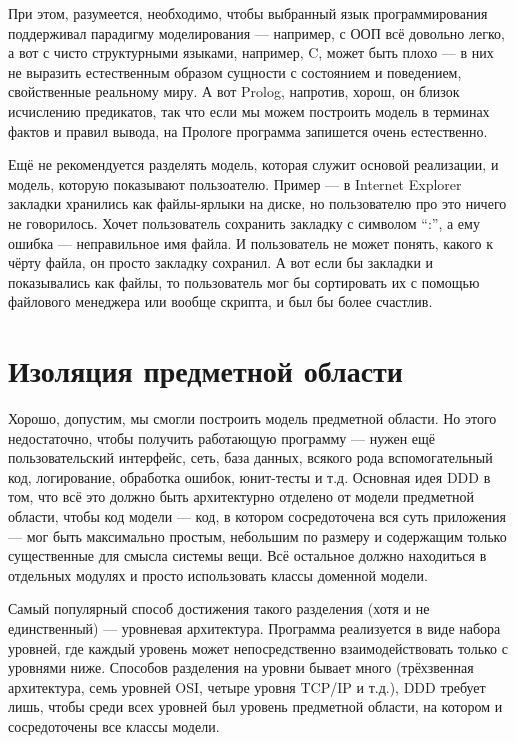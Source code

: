 \documentclass[a5paper]{article}
\begin{document}
При этом, разумеется, необходимо, чтобы выбранный язык программирования поддерживал парадигму моделирования --- например, с ООП всё довольно легко, а вот с чисто структурными языками, например, C, может быть плохо --- в них не выразить естественным образом сущности с состоянием и поведением, свойственные реальному миру. А вот Prolog, напротив, хорош, он близок исчислению предикатов, так что если мы можем построить модель в терминах фактов и правил вывода, на Прологе программа запишется очень естественно.

Ещё не рекомендуется разделять модель, которая служит основой реализации, и модель, которую показывают пользоателю. Пример --- в Internet Explorer закладки хранились как файлы-ярлыки на диске, но пользователю про это ничего не говорилось. Хочет пользователь сохранить закладку с символом ``:'', а ему ошибка --- неправильное имя файла. И пользователь не может понять, какого к чёрту файла, он просто закладку сохранил. А вот если бы закладки и показывались как файлы, то пользователь мог бы сортировать их с помощью файлового менеджера или вообще скрипта, и был бы более счастлив.

\section{Изоляция предметной области}

Хорошо, допустим, мы смогли построить модель предметной области. Но этого недостаточно, чтобы получить работающую программу --- нужен ещё пользовательский интерфейс, сеть, база данных, всякого рода вспомогательный код, логирование, обработка ошибок, юнит-тесты и т.д. Основная идея DDD в том, что всё это должно быть архитектурно отделено от модели предметной области, чтобы код модели --- код, в котором сосредоточена вся суть приложения --- мог быть максимально простым, небольшим по размеру и содержащим только существенные для смысла системы вещи. Всё остальное должно находиться в отдельных модулях и просто использовать классы доменной модели.

Самый популярный способ достижения такого разделения (хотя и не единственный) --- уровневая архитектура. Программа реализуется в виде набора уровней, где каждый уровень может непосредственно взаимодействовать только с уровнями ниже. Способов разделения на уровни бывает много (трёхзвенная архитектура, семь уровней OSI, четыре уровня TCP/IP и т.д.), DDD требует лишь, чтобы среди всех уровней был уровень предметной области, на котором и сосредоточены все классы модели.
\end{document}
